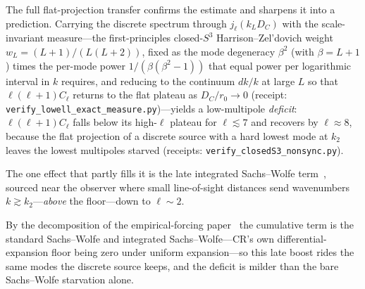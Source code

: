 \documentclass[11pt,a4paper]{article}
\theoremstyle{plain}
\theoremstyle{definition}
\theoremstyle{remark}
\begin{document}
The full flat-projection transfer confirms the estimate and sharpens it into a prediction. Carrying the discrete spectrum through $j_\ell(k_L D_C)$ with the scale-invariant measure---the first-principles closed-$S^3$ Harrison--Zel'dovich weight~\cite{Harrison1970,Zeldovich1972} $w_L=(L+1)/(L(L+2))$, fixed as the mode degeneracy $\beta^2$ (with $\beta=L+1$) times the per-mode power $1/(\beta(\beta^2-1))$ that equal power per logarithmic interval in $k$ requires, and reducing to the continuum $dk/k$ at large $L$ so that $\ell(\ell+1)C_\ell$ returns to the flat plateau as $D_C/r_0\to0$ (receipt: \texttt{verify\_lowell\_exact\_measure.py})---yields a low-multipole \emph{deficit}: $\ell(\ell+1)C_\ell$ falls below its high-$\ell$ plateau for $\ell\lesssim7$ and recovers by $\ell\approx8$, because the flat projection of a discrete source with a hard lowest mode at $k_2$ leaves the lowest multipoles starved (receipts: \texttt{verify\_closedS3\_nonsync.py}). 

The one effect that partly fills it is the late integrated Sachs--Wolfe term~\cite{SachsWolfe1967}, sourced near the observer where small line-of-sight distances send wavenumbers $k\gtrsim k_2$---\emph{above} the floor---down to $\ell\sim2$. 

By the decomposition of the empirical-forcing paper~\cite{JanzenModernParallax} the cumulative term is the standard Sachs--Wolfe and integrated Sachs--Wolfe---CR's own differential-expansion floor being zero under uniform expansion---so this late boost rides the same modes the discrete source keeps, and the deficit is milder than the bare Sachs--Wolfe starvation alone. 
\end{document}

